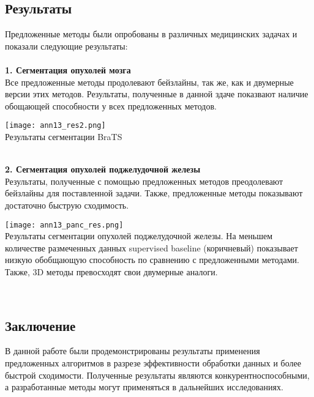 \subsection*{Результаты}
 Предложенные методы были опробованы в различных медицинских задачах и показали 
 следующие результаты: \\  \\
 \textbf{1. Сегментация опухолей мозга} \\
Все предложенные методы продолевают бейзлайны, так же, как и двумерные версии этих методов.
Результаты, полученные в данной здаче показвают наличие обощающей способности
у всех предложенных методов. \\
 \begin{minipage}{1.0\linewidth}
    \begin{center}
        \texttt{[image: ann13\_res2.png]} \\
        \caption{\scriptsize{Результаты сегментации BraTS}}
    \end{center}
\end{minipage} \\
\textbf{2. Сегментация опухолей поджелудочной железы} \\
Результаты, полученные с помощью предложенных методов преодолевают бейзлайны для поставленной 
задачи. Также, предложенные методы показывают достаточно быструю сходимость.

\begin{minipage}{1.0\linewidth}
    \begin{center}
        \texttt{[image: ann13\_panc\_res.png]} \\
        \caption{\scriptsize{Результаты сегментации опухолей поджелудочной железы.
        На меньшем количестве размеченных данных supervised baseline (коричневый) показывает 
        низкую обобщающую способность по сравнению с предложенными методами. Также, 3D методы 
        превосходят свои двумерные аналоги.}}
    \end{center}
\end{minipage} \\
\subsection*{Заключение}
В данной работе были продемонстрированы результаты применения предложенных 
алгоритмов в разрезе эффективности обработки данных и более быстрой сходимости.
Полученные результаты являются конкурентноспособными, а разработанные 
методы могут применяться в дальнейших исследованиях.